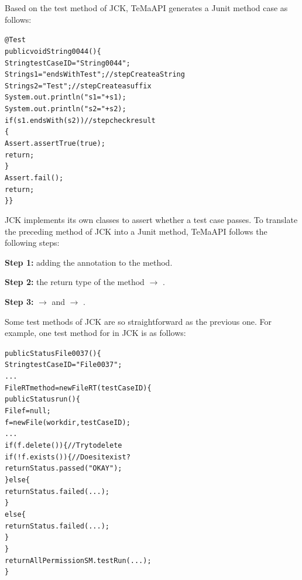 Based on the test method of JCK, TeMaAPI generates a Junit method case as follows:

\begin{CodeOut}%
\begin{alltt}
  @Test
  public void String0044()\{
    String testCaseID = "String0044";
    String s1 = "endsWith Test"; //step Create a String
    String s2 = " Test";         //step Create a suffix
    System.out.println("s1 = " + s1);
    System.out.println("s2 = " + s2);
    if( s1.endsWith(s2) )        //step check result
    \{
        Assert.assertTrue(true);
        return;
    \}
       Assert.fail();
       return;
    \}\}
\end{alltt}
\end{CodeOut}

JCK implements its own classes to assert whether a test case passes. To translate the preceding method of JCK into a Junit method, TeMaAPI follows the following steps:
 
\textbf{Step 1:} adding the  annotation to the method.

\textbf{Step 2:} the return type of the method  $\rightarrow$ .
 
\textbf{Step 3:}   $\rightarrow$  and  $\rightarrow$ . 

Some test methods of JCK are so straightforward as the previous one. For example, one test method for  in JCK is as follows:

\begin{CodeOut}%
\begin{alltt}
  public Status File0037()\{
    String testCaseID = "File0037";
    ...
    FileRT method = new FileRT(testCaseID) \{
     public Status run() \{
       File f = null;
       f = new File(workdir, testCaseID); 
       ...
       if (f.delete()) \{ // Try to delete
         if (!f.exists()) \{ // Does it exist? 
           return Status.passed("OKAY");
         \}else\{
            return Status.failed(...);
         \}
       else\{
           return Status.failed(...);
       \}  
    \}
     return AllPermissionSM.testRun(...);
  \}
\end{alltt}
\end{CodeOut}

